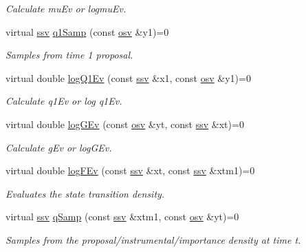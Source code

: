 \begin{DoxyCompactItemize}
\begin{DoxyCompactList}\small\item\em Calculate mu\+Ev or logmu\+Ev. \end{DoxyCompactList}\item 
virtual \hyperlink{classSISRFilter_aeaa3ff0465a0b260710a17238a95212c}{ssv} \hyperlink{classSISRFilter_ac545399710c311d09999ea0ed0cd9714}{q1\+Samp} (const \hyperlink{classSISRFilter_ad3449fbd43f19dbda6b80459d729d9bf}{osv} \&y1)=0
\begin{DoxyCompactList}\small\item\em Samples from time 1 proposal. \end{DoxyCompactList}\item 
virtual double \hyperlink{classSISRFilter_ae09630e17567151e7917a534d38c9701}{log\+Q1\+Ev} (const \hyperlink{classSISRFilter_aeaa3ff0465a0b260710a17238a95212c}{ssv} \&x1, const \hyperlink{classSISRFilter_ad3449fbd43f19dbda6b80459d729d9bf}{osv} \&y1)=0
\begin{DoxyCompactList}\small\item\em Calculate q1\+Ev or log q1\+Ev. \end{DoxyCompactList}\item 
virtual double \hyperlink{classSISRFilter_abb256b6872e8fa0d96624ab96c7b936d}{log\+G\+Ev} (const \hyperlink{classSISRFilter_ad3449fbd43f19dbda6b80459d729d9bf}{osv} \&yt, const \hyperlink{classSISRFilter_aeaa3ff0465a0b260710a17238a95212c}{ssv} \&xt)=0
\begin{DoxyCompactList}\small\item\em Calculate g\+Ev or log\+G\+Ev. \end{DoxyCompactList}\item 
virtual double \hyperlink{classSISRFilter_a420c3e85b534249b990b002681859300}{log\+F\+Ev} (const \hyperlink{classSISRFilter_aeaa3ff0465a0b260710a17238a95212c}{ssv} \&xt, const \hyperlink{classSISRFilter_aeaa3ff0465a0b260710a17238a95212c}{ssv} \&xtm1)=0
\begin{DoxyCompactList}\small\item\em Evaluates the state transition density. \end{DoxyCompactList}\item 
virtual \hyperlink{classSISRFilter_aeaa3ff0465a0b260710a17238a95212c}{ssv} \hyperlink{classSISRFilter_ad9172bc73f2902ce2e987925bfb6c2b4}{q\+Samp} (const \hyperlink{classSISRFilter_aeaa3ff0465a0b260710a17238a95212c}{ssv} \&xtm1, const \hyperlink{classSISRFilter_ad3449fbd43f19dbda6b80459d729d9bf}{osv} \&yt)=0
\begin{DoxyCompactList}\small\item\em Samples from the proposal/instrumental/importance density at time t. \end{DoxyCompactList}\item 

\end{DoxyCompactItemize}
